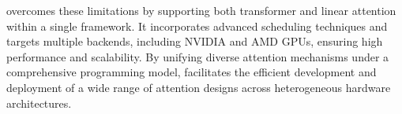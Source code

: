 
\oursys{} overcomes these limitations by supporting both transformer and linear attention within a single framework. It incorporates advanced scheduling techniques and targets multiple backends, including NVIDIA and AMD GPUs, ensuring high performance and scalability. By unifying diverse attention mechanisms under a comprehensive programming model, \oursys{} facilitates the efficient development and deployment of a wide range of attention designs across heterogeneous hardware architectures.